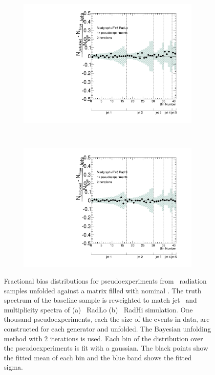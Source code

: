 \begin{figure}
\begin{subfigure}[]{0.45\textwidth}
\includegraphics[width=\textwidth]{fig/Stress/110875atlfast/FracBias2Iterations.pdf}
\end{subfigure}
~
\begin{subfigure}[]{0.45\textwidth}
\includegraphics[width=\textwidth]{fig/Stress/110878atlfast/FracBias2Iterations.pdf}
\end{subfigure}
\label{fig:radbias}
\caption{
Fractional bias distributions for pseudoexperiments from \madpy\ radiation samples unfolded against a matrix filled with nominal \madpy. The truth spectrum of the baseline sample is reweighted to match jet \pt\ and multiplicity spectra of (a) \madpy\ RadLo (b) \madpy\ RadHi simulation. One thousand pseudoexperiments, each the size of the events in data, are constructed for each generator and unfolded. The Bayesian unfolding method with 2 iterations is used. Each bin of the distribution over the pseudoexperiments is fit with a gaussian. The black points show the fitted mean of each bin and the blue band shows the fitted sigma.}
\end{figure}


